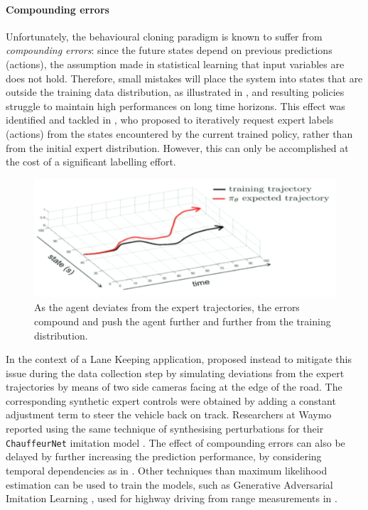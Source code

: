 \paragraph{Compounding errors} Unfortunately, the behavioural cloning paradigm is known to suffer from \emph{compounding errors}: since the future states depend on previous predictions (actions), the assumption made in statistical learning that input variables are \iid does not hold. Therefore, small mistakes will place the system into states that are outside the training data distribution, as illustrated in , and resulting policies struggle to maintain high performances on long time horizons. This effect was identified and tackled in \citep{Ross2011}, who proposed to iteratively request expert labels (actions) from the states encountered by the current trained policy, rather than from the initial expert distribution. However, this can only be accomplished at the cost of a significant labelling effort. 
\begin{figure}[th]
	\centering
	\includegraphics[width=0.7\linewidth]{img/cp4}
	\caption{As the agent deviates from the expert trajectories, the errors compound and push the agent further and further from the training distribution.}
	\label{fig:compounding}
\end{figure}
In the context of a Lane Keeping application, \citet{Bojarski2016} proposed instead to mitigate this issue during the data collection step by simulating deviations from the expert trajectories by means of two side cameras facing at the edge of the road. The corresponding synthetic expert controls were obtained by adding a constant adjustment term to steer the vehicle back on track. Researchers at Waymo reported using the same technique of synthesising perturbations for their \texttt{ChauffeurNet} imitation model \citep{Bansal2018}. The effect of compounding errors can also be delayed by further increasing the prediction performance, \eg by considering temporal dependencies as in \citep{Eraqi2017,Xu2017}. Other techniques than maximum likelihood estimation can be used to train the models, such as Generative Adversarial Imitation Learning \citep{Ho2016}, used for highway driving from range measurements in \citep{Kuefler2017,Bhattacharyya2018}.

